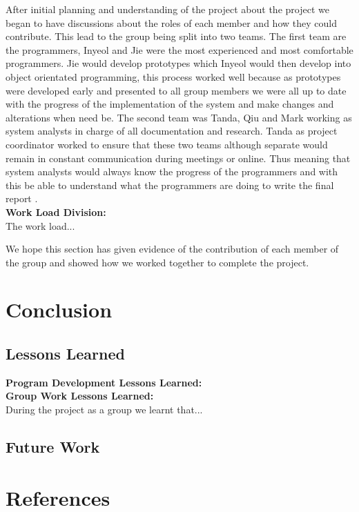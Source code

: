 \documentclass[11pt]{article}
\begin{document}
	After initial planning and understanding of the project about the project we began to have discussions about the roles of each member and how they could contribute. This lead to the group being split into two teams. The first team are the programmers, Inyeol and Jie were the most experienced and most comfortable programmers. Jie would develop prototypes which Inyeol would then develop into object orientated programming, this process worked well because as prototypes were developed early and presented to all group members we were all up to date with the progress of the implementation of the system and make changes and alterations when need be. 
	The second team was Tanda, Qiu and Mark working as system analysts in charge of all documentation and research.
	Tanda as project coordinator worked to ensure that these two teams although separate would remain in constant communication during meetings or online. Thus meaning that system analysts would always know the progress of the programmers and with this be able to understand what the programmers are doing to write the final report . \\
	\textbf{Work Load Division:}\\ 
	The work load...
	
	We hope this section has given evidence of the contribution of each member of the group and showed how we worked together to complete the project. 
	\section{Conclusion}
	\subsection{Lessons Learned} 
	\textbf{Program Development Lessons Learned:}\\ %
	
	\textbf{Group Work Lessons Learned:}\\ %
	During the project as a group we learnt that...%
	\subsection{Future Work} %
	\section{References}
	
\end{document}
